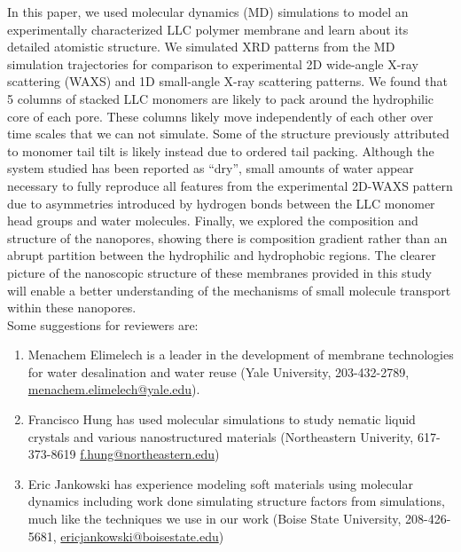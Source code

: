 \documentclass[fontsize=11pt]{article}
\begin{document}
	In this paper, we used molecular dynamics (MD) simulations to model an
	experimentally characterized LLC polymer membrane and learn about its detailed
	atomistic structure. We simulated XRD patterns from the MD simulation trajectories
	for comparison to experimental 2D wide-angle X-ray scattering (WAXS) and 1D 
	small-angle X-ray scattering patterns. We found that 5 columns of stacked LLC 
	monomers are likely to pack around the hydrophilic core of each pore. These 
	columns likely move independently of each other	over time scales that we can not
	simulate. Some of the structure previously attributed to monomer tail tilt is 
	likely instead due to ordered tail packing. Although the system studied	has been
	reported as ``dry'', small amounts of water appear necessary to fully reproduce 
	all features from the experimental 2D-WAXS pattern due to asymmetries introduced 
	by hydrogen bonds between the LLC monomer head groups and water molecules. 
	Finally, we explored the composition and structure of the nanopores, showing there is 
	composition gradient rather than an abrupt partition between the hydrophilic and
	hydrophobic regions. The clearer picture of the nanoscopic structure
	of these membranes provided in this study will enable a better understanding of the
	mechanisms of small molecule transport within these nanopores. \\
	
	\noindent Some suggestions for reviewers are:
	\begin{enumerate}

		\item Menachem Elimelech is a leader in the development of membrane technologies
		for	water desalination and water reuse (Yale University, 203-432-2789,
		\href{mailto:menachem.elimelech@yale.edu}{menachem.elimelech@yale.edu}).
	
		\item Francisco Hung has used molecular simulations to study nematic liquid crystals
		and various	nanostructured materials (Northeastern Univerity, 617-373-8619 	
		\href{mailto:f.hung@northeastern.edu}{f.hung@northeastern.edu})
		
		\item Eric Jankowski has experience modeling soft materials using molecular dynamics
		including work done simulating structure factors from simulations, much like
		the techniques we use in our work (Boise State University, 208-426-5681,
		\href{mailto:ericjankowski@boisestate.edu}{ericjankowski@boisestate.edu})
		
	\end{enumerate}
	
\end{document}
